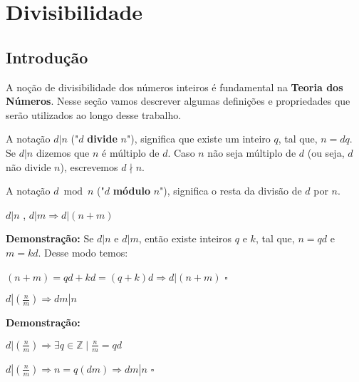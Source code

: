 
\chapter{Divisibilidade} %

\label{Chapter1} %


\section{Introdução}
A noção de divisibilidade dos números inteiros é fundamental na \textbf{Teoria dos Números}.
Nesse seção vamos descrever algumas definições e propriedades que serão utilizados ao longo desse trabalho.

\begin{definition}
A notação $d|n$ ("$d$ \textbf{divide} $n$"), significa que existe um inteiro $q$, tal que, $n = dq$.
Se $d|n$ dizemos que $n$ é múltiplo de $d$. Caso $n$ não seja múltiplo de $d$ (ou seja, $d$ não divide $n$), escrevemos $d \nmid n$.
\end{definition}

\begin{definition}
A notação $d\bmod n$ ("$d$ \textbf{módulo} $n$"), significa o resta da divisão de $d$ por $n$.
\end{definition}

\begin{proposition}\label{divisibilidade_transitiva}
$d|n$ , $d|m \Rightarrow d|(n+m)$
\end{proposition}
\textbf{Demonstração:}
Se $d|n$ e $d|m$, então existe inteiros $q$ e $k$, tal que, $n = qd$ e $m = kd$. Desse modo temos:

$(n+m) = qd + kd = (q + k)d \Rightarrow d|(n+m) $ $\square$


\begin{proposition}\label{divisibilidade_fracao}
$d|(\frac{n}{m}) \Rightarrow dm|n$
\end{proposition}
\textbf{Demonstração:}

$d|(\frac{n}{m}) \Rightarrow \exists q \in \mathbb{Z} \mid \frac{n}{m} = qd$

$d|(\frac{n}{m}) \Rightarrow n = q(dm) \Rightarrow dm|n$ $\square$


